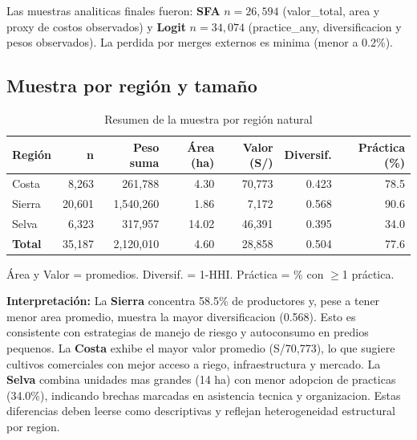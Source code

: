 \documentclass[10pt,a4paper]{article}
\begin{document}
Las muestras analiticas finales fueron: \textbf{SFA} $n=26{,}594$ (valor\_total, area y proxy de costos observados) y \textbf{Logit} $n=34{,}074$ (practice\_any, diversificacion y pesos observados). La perdida por merges externos es minima (menor a 0.2\%).

\subsection{Muestra por región y tamaño}

\begin{table}[H]
\centering
\caption{Resumen de la muestra por región natural}
\label{tab:sample_region}
\begin{threeparttable}
\small
\begin{tabular}{lrrrrrr}
\toprule
\textbf{Región} & \textbf{n} & \textbf{Peso suma} & \textbf{Área (ha)} & \textbf{Valor (S/)} & \textbf{Diversif.} & \textbf{Práctica (\%)} \\
\midrule
Costa & 8,263 & 261,788 & 4.30 & 70,773 & 0.423 & 78.5 \\
Sierra & 20,601 & 1,540,260 & 1.86 & 7,172 & 0.568 & 90.6 \\
Selva & 6,323 & 317,957 & 14.02 & 46,391 & 0.395 & 34.0 \\
\midrule
\textbf{Total} & 35,187 & 2,120,010 & 4.60 & 28,858 & 0.504 & 77.6 \\
\bottomrule
\end{tabular}
\begin{tablenotes}
\footnotesize
\item Área y Valor = promedios. Diversif. = 1-HHI. Práctica = \% con $\geq$1 práctica.
\end{tablenotes}
\end{threeparttable}
\end{table}

\textbf{Interpretación:} La \textbf{Sierra} concentra 58.5\% de productores y, pese a tener menor area promedio, muestra la mayor diversificacion (0.568). Esto es consistente con estrategias de manejo de riesgo y autoconsumo en predios pequenos. La \textbf{Costa} exhibe el mayor valor promedio (S/70,773), lo que sugiere cultivos comerciales con mejor acceso a riego, infraestructura y mercado. La \textbf{Selva} combina unidades mas grandes (14 ha) con menor adopcion de practicas (34.0\%), indicando brechas marcadas en asistencia tecnica y organizacion. Estas diferencias deben leerse como descriptivas y reflejan heterogeneidad estructural por region.
\end{document}
